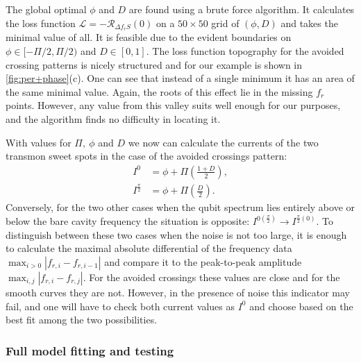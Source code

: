 \documentclass[%
 aip,
 amsmath,amssymb,
 reprint,%
]{revtex4-1}
\begin{document}
The global optimal $\phi$ and $D$ are found using a brute force algorithm. It calculates the loss function $\mathcal{L} = - \mathcal{R}_{\Delta f_r S}(0)$ on a $50 \times 50$ grid of $(\phi, D)$ and takes the minimal value of all. It is feasible due to the evident boundaries on $\phi \in [-\Pi/2,\Pi/2)$ and $D \in [0, 1]$. The loss function topography for the avoided crossing patterns is nicely structured and for our example is shown in \autoref{fig:per+phase}(c). One can see that instead of a single minimum it has an area of the same minimal value. Again, the roots of this effect lie in the missing $f_r$ points. However, any value from this valley suits well enough for our purposes, and the algorithm finds no difficulty in locating it.

With values for $\Pi,\ \phi$ and $D$ we now can calculate the currents of the two transmon sweet spots in the case of the avoided crossings pattern:
\begin{align}
I^{0} &= \phi + \Pi \left(\frac{1+D}{2}\right) ,\\
I^{\frac{\pi}{2}} &= \phi + \Pi \left(\frac{D}{2}\right).
\end{align}
Conversely, for the two other cases when the qubit spectrum lies entirely above or below the bare cavity frequency the situation is opposite: $I^{0(\frac{\pi}{2})} \rightarrow I^{\frac{\pi}{2}(0)}$. To distinguish between these two cases when the noise is not too large, it is enough to calculate the maximal absolute differential of the frequency data $\max_{i>0} |f_{r,i} - f_{{r,i}-1}|$ and compare it to the peak-to-peak amplitude $\max_{i,j} | f_{r,i} - f_{r, j}|$. For the avoided crossings these values are close and for the smooth curves they are not. However, in the presence of noise this indicator may fail, and one will have to check both current values as $I^0$ and choose based on the best fit among the two possibilities.


\subsubsection{Full model fitting and testing}
\end{document}
